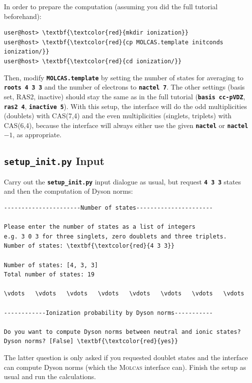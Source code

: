 \documentclass[a4paper,11pt,DIV=15,openany]{scrbook}
\newcommand{\ttt}[1]{\textbf{\texttt{#1}}}
\begin{document}
In order to prepare the computation (assuming you did the full tutorial beforehand):
\begin{Verbatim}[commandchars=\\\{\}]
user@host> \textbf{\textcolor{red}{mkdir ionization}}
user@host> \textbf{\textcolor{red}{cp MOLCAS.template initconds ionization/}}
user@host> \textbf{\textcolor{red}{cd ionization/}}
\end{Verbatim}
Then, modify \ttt{MOLCAS.template} by setting the number of states for averaging to \ttt{roots 4 3 3} and the number of electrons to \ttt{nactel 7}. The other settings (basis set, RAS2, inactive) should stay the same as in the full tutorial (\ttt{basis cc-pVDZ}, \ttt{ras2 4}, \ttt{inactive 5}).
With this setup, the interface will do the odd multiplicities (doublets) with CAS(7,4) and the even multiplicities (singlets, triplets) with CAS(6,4), because the interface will always either use the given \ttt{nactel} or \ttt{nactel}$-1$, as appropriate.

\subsection{\ttt{setup\_init.py} Input}

Carry out the \ttt{setup\_init.py} input dialogue as usual, but request \ttt{4 3 3} states and then the computation of Dyson norms:
\begin{oframed}
\footnotesize\begin{Verbatim}[commandchars=\\\{\}]
----------------------Number of states----------------------

Please enter the number of states as a list of integers
e.g. 3 0 3 for three singlets, zero doublets and three triplets.
Number of states: \textbf{\textcolor{red}{4 3 3}}

Number of states: [4, 3, 3]
Total number of states: 19

\vdots   \vdots   \vdots   \vdots   \vdots   \vdots   \vdots   \vdots   

------------Ionization probability by Dyson norms-----------

Do you want to compute Dyson norms between neutral and ionic states?
Dyson norms? [False] \textbf{\textcolor{red}{yes}}
\end{Verbatim}
\end{oframed}

\normalsize
The latter question is only asked if you requested doublet states and the interface can compute Dyson norms (which the \textsc{Molcas} interface can).
Finish the setup as usual and run the calculations.
\end{document}
